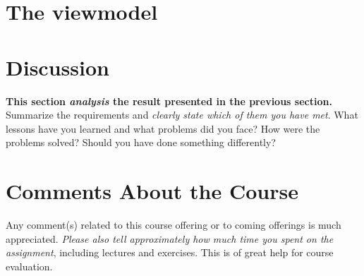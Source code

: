 \documentclass[a4paper]{scrartcl}
\begin{document}
\section{The viewmodel}

%

\section{Discussion}

\textbf{This section \textit{analysis} the result presented in the previous section.} \\

\noindent Summarize the requirements and \textit{clearly state which of them you have met}. What lessons have you learned and what problems did you face? How were the problems solved? Should you have done something differently?

\section{Comments About the Course}

Any comment(s) related to this course offering or to coming offerings is much appreciated. \textit{Please also tell approximately how much time you spent on the assignment}, including lectures and exercises. This is of great help for course evaluation.
\end{document}
